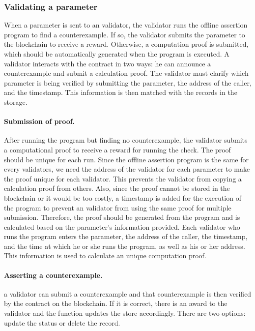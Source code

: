 \documentclass[runningheads]{llncs}
\begin{document}
\subsubsection{Validating a parameter}
When a parameter is sent to an validator, the validator runs the offline assertion program to find a counterexample. If so, the validator submits the parameter to the blockchain to receive a reward. Otherwise, a computation proof is submitted, which should be automatically generated when the program is executed. A validator interacts with the contract in two ways: he can announce a counterexample and submit a calculation proof. The validator must clarify which parameter is being verified by submitting the parameter, the address of the caller, and the timestamp. This information is then matched with the records in the storage.

\paragraph{Submission of proof.} After running the program but finding no counterexample, the validator submits a computational proof to receive a reward for running the check. The proof should be unique for each run. Since the offline assertion program is the same for every validators, we need the address of the validator for each parameter to make the proof unique for each validator. This prevents the validator from copying a calculation proof from others. Also, since the proof cannot be stored in the blockchain or it would be too costly, a timestamp is added for the execution of the program to prevent an validator from using the same proof for multiple submission. Therefore, the proof should be generated from the program and is calculated based on the parameter's information provided. Each validator who runs the program enters the parameter, the address of the caller, the timestamp, and the time at which he or she runs the program, as well as his or her address. This information is used to calculate an unique computation proof.
\paragraph{Asserting a counterexample.} a validator can submit a counterexample and that counterexample is then verified by the contract on the blockchain. If it is correct, there is an award to the validator and the function updates the store accordingly. There are two options: update the status or delete the record. 
 
\end{document}
